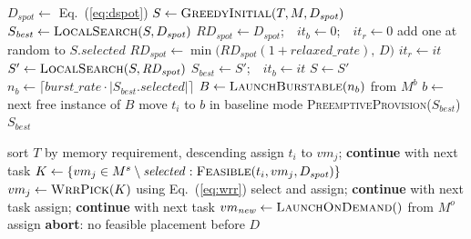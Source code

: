 \documentclass[conference]{IEEEtran}
\begin{document}
\begin{algorithm}[t]
\caption{R-BurstHADS primary scheduler}
\label{alg:primary}
\begin{algorithmic}[1]
\STATE $D_{\mathit{spot}} \leftarrow$ Eq.~(\ref{eq:dspot})
\STATE $S \leftarrow \textsc{GreedyInitial}(T, M, D_{\mathit{spot}})$
\STATE $S_{\mathit{best}} \leftarrow \textsc{LocalSearch}(S, D_{\mathit{spot}})$
\STATE $\mathit{RD}_{\mathit{spot}} \leftarrow D_{\mathit{spot}}$;\ \ $it_b \leftarrow 0$;\ \ $it_r \leftarrow 0$
    \STATE add one at random to $S.\mathit{selected}$
  \ENDIF
    \STATE $\mathit{RD}_{\mathit{spot}} \leftarrow \min\!\big(\mathit{RD}_{\mathit{spot}}(1+\mathit{relaxed\_rate}),\, D\big)$
    \STATE $it_r \leftarrow it$
  \ENDIF
  \STATE $S' \leftarrow \textsc{LocalSearch}(S, \mathit{RD}_{\mathit{spot}})$
    \STATE $S_{\mathit{best}} \leftarrow S'$;\ \ $it_b \leftarrow it$
  \ENDIF
  \STATE $S \leftarrow S'$
\ENDFOR
\STATE $n_b \leftarrow \lceil \mathit{burst\_rate}\cdot|S_{\mathit{best}}.\mathit{selected}|\rceil$
\STATE $B \leftarrow \textsc{LaunchBurstable}(n_b)$ from $M^{b}$
  \STATE $b \leftarrow$ next free instance of $B$
    \STATE move $t_i$ to $b$ in baseline mode
  \ENDIF
\ENDFOR
\STATE \textsc{PreemptiveProvision}($S_{\mathit{best}}$) 
\RETURN $S_{\mathit{best}}$
\end{algorithmic}
\end{algorithm}

\begin{algorithm}[t]
\caption{\textsc{GreedyInitial}: initial solution}
\label{alg:greedy}
\begin{algorithmic}[1]
\STATE sort $T$ by memory requirement, descending
      \STATE assign $t_i$ to $vm_j$; \textbf{continue} with next task
    \ENDIF
  \ENDFOR
  \STATE $K \leftarrow \{vm_j \in M^{s}\setminus \mathit{selected} : \textsc{Feasible}(t_i,vm_j,D_{\mathit{spot}})\}$
  \STATE $vm_j \leftarrow \textsc{WrrPick}(K)$ using Eq.~(\ref{eq:wrr})
    \STATE select and assign; \textbf{continue} with next task
  \ENDIF
      \STATE assign; \textbf{continue} with next task
    \ENDIF
  \ENDFOR
  \STATE $vm_{\mathit{new}} \leftarrow \textsc{LaunchOnDemand}()$ from $M^{o}$
    \STATE assign
  \ELSE
    \STATE \textbf{abort}: no feasible placement before $D$
  \ENDIF
\ENDFOR
\end{algorithmic}
\end{algorithm}
\end{document}
